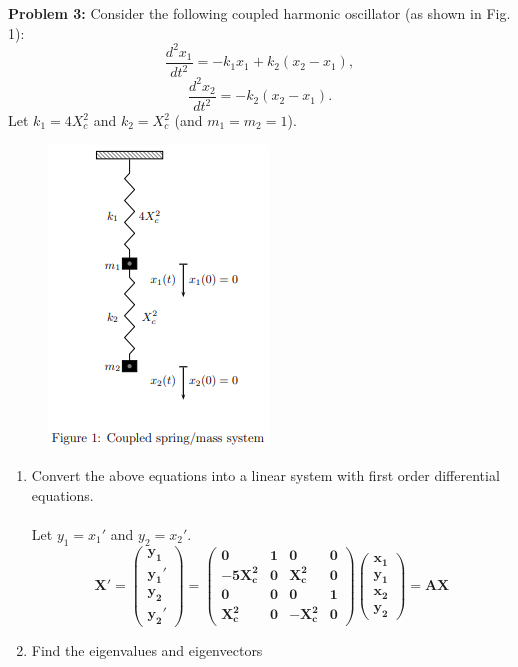 \documentclass[11pt]{article}
\newenvironment{problem}[1]{\textbf{Problem #1: }}{\newpage}
\begin{document}
	\begin{problem}{3}
		Consider the following coupled harmonic oscillator (as shown
		in Fig. 1):
		\[\frac{d^2x_1}{dt^2} = -k_1x_1 + k_2(x_2 - x_1), \tag{3.1}\]
		\[\frac{d^2x_2}{dt^2} = -k_2(x_2 - x_1). \tag{3.2}\]
		Let $k_1 = 4X^2_c$ and $k_2 = X^2_c$ (and $m_1 = m_2 = 1$).
		\begin{figure}[h!]
			\centering
			\includegraphics{Prob3}
		\end{figure}
		\begin{enumerate}[label = (\alph*)]
			\item  Convert the above equations into a linear system with first order differential equations.
			\\ \\
			Let $y_1 = x_1'$ and $y_2 = x_2'$.
			\[\boldsymbol{X' = \begin{pmatrix}
				y_1 \\ y_1' \\ y_2 \\ y_2'
			\end{pmatrix} = \begin{pmatrix}
				0 & 1 & 0 & 0 \\
				-5X^2_c & 0 & X^2_c & 0 \\
				0 & 0 & 0 & 1 \\
				X^2_c & 0 & -X^2_c & 0
			\end{pmatrix}\begin{pmatrix}
				x_1 \\ y_1 \\ x_2 \\ y_2
			\end{pmatrix} = AX}\]
			\item  Find the eigenvalues and eigenvectors
			\\ \\

\end{enumerate}
\end{problem}
\end{document}
